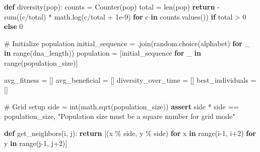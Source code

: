 \documentclass[
  letterpaper,
  DIV=11,
  numbers=noendperiod]{scrreprt}
\newenvironment{Shaded}{\begin{snugshade}}{\end{snugshade}}
\newcommand{\BuiltInTok}[1]{\textcolor[rgb]{0.00,0.23,0.31}{#1}}
\newcommand{\CommentTok}[1]{\textcolor[rgb]{0.37,0.37,0.37}{#1}}
\newcommand{\ControlFlowTok}[1]{\textcolor[rgb]{0.00,0.23,0.31}{\textbf{#1}}}
\newcommand{\DecValTok}[1]{\textcolor[rgb]{0.68,0.00,0.00}{#1}}
\newcommand{\FloatTok}[1]{\textcolor[rgb]{0.68,0.00,0.00}{#1}}
\newcommand{\KeywordTok}[1]{\textcolor[rgb]{0.00,0.23,0.31}{\textbf{#1}}}
\newcommand{\NormalTok}[1]{\textcolor[rgb]{0.00,0.23,0.31}{#1}}
\newcommand{\OperatorTok}[1]{\textcolor[rgb]{0.37,0.37,0.37}{#1}}
\newcommand{\StringTok}[1]{\textcolor[rgb]{0.13,0.47,0.30}{#1}}
\theoremstyle{definition}
\theoremstyle{remark}
\begin{document}
\begin{tcolorbox}
\begin{Shaded}
\begin{Highlighting}[]
\KeywordTok{def}\NormalTok{ diversity(pop):}
\NormalTok{    counts }\OperatorTok{=}\NormalTok{ Counter(pop)}
\NormalTok{    total }\OperatorTok{=} \BuiltInTok{len}\NormalTok{(pop)}
    \ControlFlowTok{return} \OperatorTok{{-}}\BuiltInTok{sum}\NormalTok{((c}\OperatorTok{/}\NormalTok{total) }\OperatorTok{*}\NormalTok{ math.log(c}\OperatorTok{/}\NormalTok{total }\OperatorTok{+} \FloatTok{1e{-}9}\NormalTok{) }\ControlFlowTok{for}\NormalTok{ c }\KeywordTok{in}\NormalTok{ counts.values()) }\ControlFlowTok{if}\NormalTok{ total }\OperatorTok{\textgreater{}} \DecValTok{0} \ControlFlowTok{else} \DecValTok{0}

\CommentTok{\# Initialize population}
\NormalTok{initial\_sequence }\OperatorTok{=} \StringTok{\textquotesingle{}\textquotesingle{}}\NormalTok{.join(random.choice(alphabet) }\ControlFlowTok{for}\NormalTok{ \_ }\KeywordTok{in} \BuiltInTok{range}\NormalTok{(dna\_length))}
\NormalTok{population }\OperatorTok{=}\NormalTok{ [initial\_sequence }\ControlFlowTok{for}\NormalTok{ \_ }\KeywordTok{in} \BuiltInTok{range}\NormalTok{(population\_size)]}

\NormalTok{avg\_fitness }\OperatorTok{=}\NormalTok{ []}
\NormalTok{avg\_beneficial }\OperatorTok{=}\NormalTok{ []}
\NormalTok{diversity\_over\_time }\OperatorTok{=}\NormalTok{ []}
\NormalTok{best\_individuals }\OperatorTok{=}\NormalTok{ []}

\CommentTok{\# Grid setup}
\NormalTok{side }\OperatorTok{=} \BuiltInTok{int}\NormalTok{(math.sqrt(population\_size))}
\ControlFlowTok{assert}\NormalTok{ side }\OperatorTok{*}\NormalTok{ side }\OperatorTok{==}\NormalTok{ population\_size, }\StringTok{"Population size must be a square number for grid mode"}

\KeywordTok{def}\NormalTok{ get\_neighbors(i, j):}
    \ControlFlowTok{return}\NormalTok{ [(x }\OperatorTok{\%}\NormalTok{ side, y }\OperatorTok{\%}\NormalTok{ side)}
            \ControlFlowTok{for}\NormalTok{ x }\KeywordTok{in} \BuiltInTok{range}\NormalTok{(i}\OperatorTok{{-}}\DecValTok{1}\NormalTok{, i}\OperatorTok{+}\DecValTok{2}\NormalTok{)}
            \ControlFlowTok{for}\NormalTok{ y }\KeywordTok{in} \BuiltInTok{range}\NormalTok{(j}\OperatorTok{{-}}\DecValTok{1}\NormalTok{, j}\OperatorTok{+}\DecValTok{2}\NormalTok{)]}


\end{Highlighting}
\end{Shaded}
\end{tcolorbox}
\end{document}
